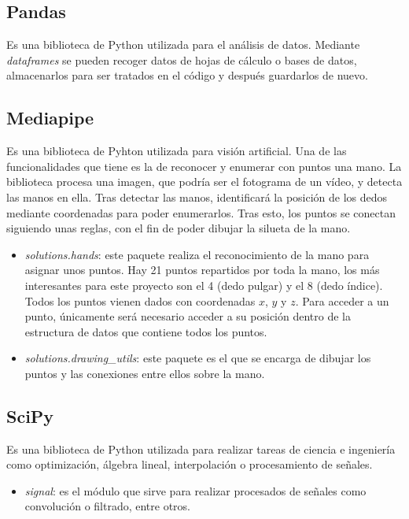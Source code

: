 \subsection{Pandas}
Es una biblioteca de Python utilizada para el análisis de datos. Mediante \textit{dataframes} se pueden recoger datos de hojas de cálculo o bases de datos, almacenarlos para ser tratados en el código y después guardarlos de nuevo.~\cite{wiki:pandas}

\subsection{Mediapipe}\label{lib:mediapipe}
Es una biblioteca de Pyhton utilizada para visión artificial. Una de las funcionalidades que tiene es la de reconocer y enumerar con puntos una mano. La biblioteca procesa una imagen, que podría ser el fotograma de un vídeo, y detecta las manos en ella. Tras detectar las manos, identificará la posición de los dedos mediante coordenadas para poder enumerarlos. Tras esto, los puntos se conectan siguiendo unas reglas, con el fin de poder dibujar la silueta de la mano.
\begin{itemize}
	\item \textit{solutions.hands}: este paquete realiza el reconocimiento de la mano para asignar unos puntos. Hay 21 puntos repartidos por toda la mano, los más interesantes para este proyecto son el 4 (dedo pulgar) y el 8 (dedo índice). Todos los puntos vienen dados con coordenadas $x$, $y$ y $z$. Para acceder a un punto, únicamente será necesario acceder a su posición dentro de la estructura de datos que contiene todos los puntos. \cite{mediapipehands}
	\item \textit{solutions.drawing\_utils}: este paquete es el que se encarga de dibujar los puntos y las conexiones entre ellos sobre la mano.
\end{itemize}

\subsection{SciPy}
Es una biblioteca de Python utilizada para realizar tareas de ciencia e ingeniería como optimización, álgebra lineal, interpolación o procesamiento de señales.~\cite{wiki:scipy}
\begin{itemize}
	\item \textit{signal}: es el módulo que sirve para realizar procesados de señales como convolución o filtrado, entre otros.~\cite{scipysignal}
\end{itemize}

